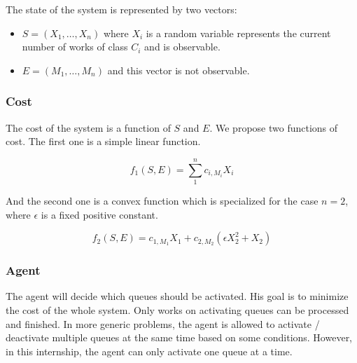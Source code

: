 \documentclass[
  a4paper, xcolor = usenames,dvipsnames]{article}
\providecommand{\tightlist}{%
  \setlength{\itemsep}{0pt}\setlength{\parskip}{0pt}}
\begin{document}
The state of the system is represented by two vectors:

\begin{itemize}
\tightlist
\item
  \(S = (X_{1}, \dots, X_{n})\) where \(X_{i}\) is a random variable represents the current number of works of class \(C_{i}\) and is observable.
\item
  \(E = (M_{1}, \dots, M_{n})\) and this vector is not observable.
\end{itemize}

\hypertarget{cost}{%
\subsubsection{Cost}\label{cost}}

The cost of the system is a function of \(S\) and \(E\). We propose two functions of cost. The first one is a simple linear function.

\[
f_{1}(S, E) = \sum_{1}^{n} c_{i, M_{i}} X_{i}
\]

And the second one is a convex function which is specialized for the case \(n = 2\), where \(\epsilon\) is a fixed positive constant.

\[
f_{2}(S, E) = c_{1, M_{1}} X_{1} + c_{2, M_{2}} (\epsilon X_{2}^{2} + X_{2})
\]

\hypertarget{agent}{%
\subsubsection{Agent}\label{agent}}

The agent will decide which queues should be activated. His goal is to minimize the cost of the whole system. Only works on activating queues can be processed and finished. In more generic problems, the agent is allowed to activate / deactivate multiple queues at the same time based on some conditions. However, in this internship, the agent can only activate one queue at a time.
\end{document}
